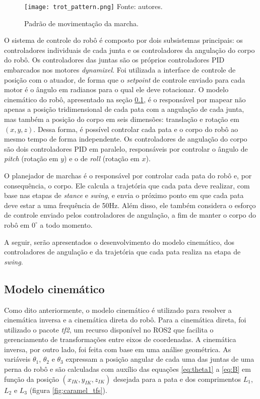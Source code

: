 \documentclass[../main.tex]{subfiles}
\begin{document}
\begin{figure}[!htb]
  \caption{Padrão de movimentação da marcha.}
  \centering
  \texttt{[image: trot\_pattern.png]}
  \vfill
  Fonte: autores.
  \label{fig:trot_pattern}
\end{figure}

O sistema de controle do robô é composto por dois subsistemas principais: os controladores individuais de cada junta e os controladores da angulação do corpo do robô. Os controladores das juntas são os próprios controladores PID embarcados nos motores \textit{dynamixel}. Foi utilizada a interface de controle de posição com o atuador, de forma que o \textit{setpoint} de controle enviado para cada motor é o ângulo em radianos para o qual ele deve rotacionar. O modelo cinemático do robô, apresentado na seção \ref{sec:detail_inv_kinematics}, é o responsável por mapear não apenas a posição tridimensional de cada pata com a angulação de cada junta, mas também a posição do corpo em seis dimensões: translação e rotação em $(x, y, z)$. Dessa forma, é possível controlar cada pata e o corpo do robô ao mesmo tempo de forma independente. Os controladores de angulação do corpo são dois controladores PID em paralelo, responsáveis por controlar o ângulo de \textit{pitch} (rotação em $y$) e o de \textit{roll} (rotação em $x$).

O planejador de marchas é o responsável por controlar cada pata do robô e, por consequência, o corpo. Ele calcula a trajetória que cada pata deve realizar, com base nas etapas de \textit{stance} e \textit{swing}, e envia o próximo ponto em que cada pata deve estar a uma frequência de 50Hz. Além disso, ele também considera o esforço de controle enviado pelos controladores de angulação, a fim de manter o corpo do robô em $0^{\circ}$ a todo momento.

A seguir, serão apresentados o desenvolvimento do modelo cinemático, dos controladores de angulação e da trajetória que cada pata realiza na etapa de \textit{swing}.

\subsection{Modelo cinemático}
\label{sec:detail_inv_kinematics}

Como dito anteriormente, o modelo cinemático é utilizado para resolver a cinemática inversa e a cinemática direta do robô. Para a cinemática direta, foi utilizado o pacote \textit{tf2}, um recurso disponível no ROS2 que facilita o gerenciamento de transformações entre eixos de coordenadas. A cinemática inversa, por outro lado, foi feita com base em uma análise geométrica. As variáveis $\theta_1$, $\theta_2$ e $\theta_3$ expressam a posição angular de cada uma das juntas de uma perna do robô e são calculadas com auxílio das equações \ref{eq:theta1} a \ref{eq:B} em função da posição $(x_{IK}, y_{IK}, z_{IK})$ desejada para a pata e dos comprimentos $L_1$, $L_2$ e $L_3$ (figura \ref{fig:caramel_tfs}).
\end{document}
